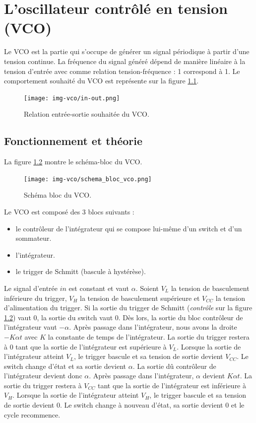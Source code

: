 \chapter{L'oscillateur contrôlé en tension (VCO)}
\label{chap:vco}
Le VCO est la partie qui s'occupe de générer un signal périodique à partir d'une tension continue. 
La fréquence du signal généré dépend de manière linéaire à la tension d'entrée avec comme relation
tension-fréquence : \unit{1}{\milli\volt} correspond à \unit{1}{\hertz}. Le comportement
souhaité du VCO est représente sur la figure \ref{fig:in-out-vco}.

\begin{figure}[ht]
	\centering
	\texttt{[image: img-vco/in-out.png]}
	\caption{Relation entrée-sortie souhaitée du VCO.}
	\label{fig:in-out-vco}
\end{figure}

\section{Fonctionnement et théorie}
La figure \ref{fig:schema_bloc_vco} montre le schéma-bloc du VCO.

\begin{figure}[ht]
	\centering
	\texttt{[image: img-vco/schema\_bloc\_vco.png]}
	\caption{Schéma bloc du VCO.}
	\label{fig:schema_bloc_vco}
\end{figure}

Le VCO est composé des 3 blocs suivants :
\begin{itemize}
	\item le contrôleur de l'intégrateur qui se compose lui-même d'un switch et d'un sommateur.
	\item l'intégrateur.
	\item le trigger de Schmitt (bascule à hystérèse).
\end{itemize}

Le signal d'entrée $in$ est constant et vaut $\alpha$. Soient $V_L$ la
tension de basculement inférieure du trigger, $V_H$ la tension de 
basculement supérieure et $V_{CC}$ la tension d'alimentation du trigger.
Si la sortie du trigger de Schmitt (\textit{contrôle} sur la figure \ref{fig:schema_bloc_vco}) 
vaut $0$, la sortie du switch vaut $0$. Dès lors, la sortie du bloc contrôleur de l'intégrateur vaut $-\alpha$. Après passage dans l'intégrateur, nous avons la 
droite $-K\alpha t$ avec $K$ la constante de temps de l'intégrateur. La sortie du trigger
restera à $0$ tant que la sortie de l'intégrateur est supérieure à $V_L$. Lorsque la sortie
de l'intégrateur atteint $V_L$, le trigger bascule et sa tension de sortie devient $V_{CC}$. 
Le switch change d'état et sa sortie devient $\alpha$. La sortie dû contrôleur de l'intégrateur
devient donc $\alpha$. Après passage dans l'intégrateur, $\alpha$ devient $K\alpha t$. 
La sortie du trigger restera à $V_{CC}$ tant que la sortie de l'intégrateur est inférieure à $V_H$.
Lorsque la sortie de l'intégrateur atteint $V_H$, le trigger bascule et sa tension de sortie devient
$0$. Le switch change à nouveau d'état, sa sortie devient $0$ et le cycle recommence.

